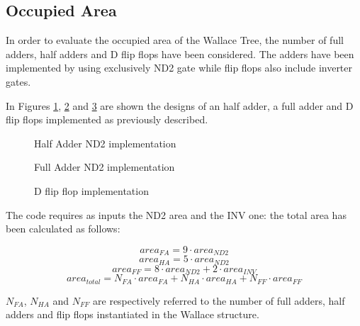 \subsection{Occupied Area}
In order to evaluate the occupied area of the Wallace Tree, the number of full adders, half adders and D flip flops have been considered. The adders have been implemented by using exclusively ND2 gate while flip flops also include inverter gates.

In Figures \ref{fig:half_adder}, \ref{fig:full_adder} and \ref{fig:f_f} are shown the designs of an half adder, a full adder and D flip flops implemented as previously described.

\begin{figure}[H]
	\centering
	\textsf{{\fontsize{9pt}{5.5pt}
			}}
	\caption{Half Adder ND2 implementation}
	\label{fig:half_adder}
\end{figure}

\begin{figure}[H]
	\centering
	\textsf{{\fontsize{9pt}{4.0pt}
			}}
	\caption{Full Adder ND2 implementation}
	\label{fig:full_adder}
\end{figure}

\begin{figure}[H]
	\centering
	\textsf{{\fontsize{9pt}{5.5pt}
			}}
	\caption{D flip flop implementation}
	\label{fig:f_f}
\end{figure}
The code requires as inputs the ND2 area and the INV one: the total area has been calculated as follows:

\begin{equation}
area_{FA}=9\cdot area_{ND2}
\end{equation}
\begin{equation}
area_{HA}=5\cdot area_{ND2}
\end{equation}
\begin{equation}
area_{FF}=8\cdot area_{ND2}+2\cdot area_{INV}
\end{equation}
\begin{equation}
area_{total}=N_{FA}\cdot area_{FA}+N_{HA}\cdot area_{HA}+N_{FF}\cdot area_{FF}
\end{equation}

$N_{FA}$, $N_{HA}$ and $N_{FF}$ are respectively referred to the number of full adders, half adders and flip flops instantiated in the Wallace structure.